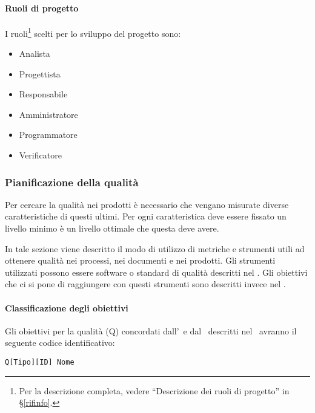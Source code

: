 			\paragraph{Ruoli di progetto}
			I ruoli\footnote{Per la descrizione completa, vedere ``Descrizione dei ruoli di progetto'' in \S\ref{rifinfo}.} scelti per lo sviluppo del progetto sono:
			\begin{itemize}[noitemsep]
				\item Analista
				\item Progettista
				\item Responsabile
				\item Amministratore
				\item Programmatore
				\item Verificatore
			\end{itemize}


		\subsubsection{Pianificazione della qualità}\label{Pianificazione qualita}
		Per cercare la qualità nei prodotti è necessario che vengano misurate diverse caratteristiche di questi ultimi.
		Per ogni caratteristica deve essere fissato un livello minimo è un livello ottimale che questa deve avere.
		
		In tale sezione viene descritto il modo di utilizzo di metriche e strumenti utili ad ottenere qualità nei processi, nei documenti e nei prodotti.
		Gli strumenti utilizzati possono essere software o standard di qualità descritti nel \Doc{\PdQv}.
		Gli obiettivi che ci si pone di raggiungere con questi strumenti sono descritti invece nel \Doc{\PdQv}.
			
			\paragraph{Classificazione degli obiettivi}
			Gli obiettivi per la qualità (Q) concordati dall'\Amm\ e dal \Ver\ descritti nel \PdQ\ avranno il seguente codice identificativo:

			\begin{center}
				\texttt{Q[Tipo][ID] Nome}
			\end{center}
		
